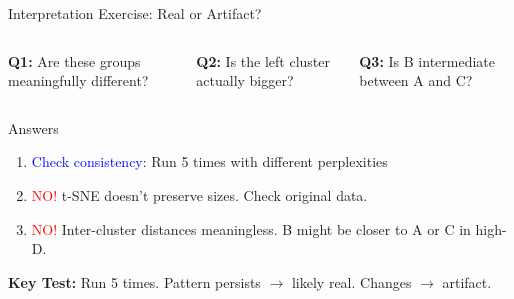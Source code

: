 \documentclass[aspectratio=169]{beamer}
\begin{document}
\begin{frame}{Interpretation Exercise: Real or Artifact?}

\begin{columns}
\centering
{}

\textbf{Q1:} Are these groups meaningfully different?

\centering
{}

\textbf{Q2:} Is the left cluster actually bigger?

\centering
{}

\textbf{Q3:} Is B intermediate between A and C?
\end{columns}

\vspace{0.5cm}

\begin{block}{Answers}
\begin{enumerate}
    \item \textcolor{blue}{Check consistency}: Run 5 times with different perplexities
    \item \textcolor{red}{NO!} t-SNE doesn't preserve sizes. Check original data.
    \item \textcolor{red}{NO!} Inter-cluster distances meaningless. B might be closer to A or C in high-D.
\end{enumerate}
\end{block}

\centering
\textbf{Key Test:} Run 5 times. Pattern persists $\rightarrow$ likely real. Changes $\rightarrow$ artifact.

\end{frame}
\end{document}
